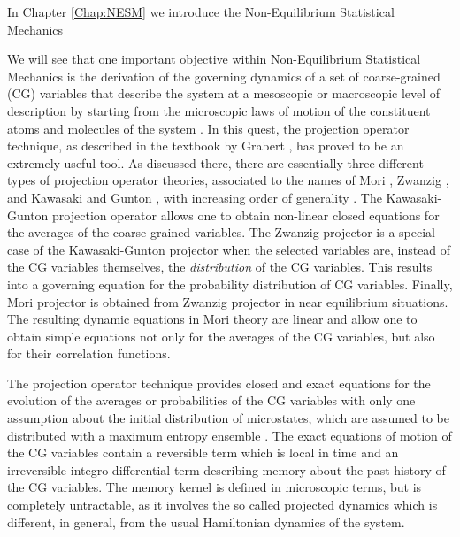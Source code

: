 \documentclass[a4paper,openright,12pt]{book}
\begin{document}
In Chapter \ref{Chap:NESM} we introduce the Non-Equilibrium Statistical Mechanics


We will see that one important  objective within Non-Equilibrium  Statistical Mechanics
is the derivation of the governing dynamics of a set of coarse-grained
(CG) variables that describe the system at a mesoscopic or macroscopic
level of description  by starting from the microscopic  laws of motion
of the constituent atoms and  molecules of the system \cite{Kubo1991}.
In this quest, the projection  operator technique, as described in the
textbook by Grabert \cite{Grabert1982}, has  proved to be an extremely
useful  tool.   As  discussed   there,  there  are  essentially  three
different  types of  projection operator  theories, associated  to the
names  of   Mori  \cite{Mori1965},  Zwanzig   \cite{Zwanzig1961},  and
Kawasaki  and Gunton  \cite{Kawasaki1973},  with  increasing order  of
generality \cite{Grabert1982}. The Kawasaki-Gunton projection operator
allows one to  obtain non-linear closed equations for  the averages of
the coarse-grained variables. The Zwanzig  projector is a special case
of  the Kawasaki-Gunton  projector  when the  selected variables  are,
instead of  the CG variables themselves,  the \textit{distribution} of
the  CG variables.  This results  into  a governing  equation for  the
probability distribution of CG  variables.  Finally, Mori projector is
obtained    from    Zwanzig     projector    in    near    equilibrium
situations\cite{Grabert1982,Kauzlaric2011a}.   The  resulting  dynamic
equations in  Mori theory are  linear and  allow one to  obtain simple
equations not only for the averages  of the CG variables, but also for
their correlation functions.

The projection operator technique  provides closed and exact equations
for the  evolution of the averages or probabilities  of the CG variables  with only one
assumption about  the initial  distribution of microstates,  which are
assumed   to  be   distributed   with  a   maximum  entropy   ensemble
\cite{Grabert1982}. The exact equations of  motion of the CG variables
contain a reversible  term which is local in time  and an irreversible
integro-differential term describing memory  about the past history of
the CG variables.  The memory  kernel is defined in microscopic terms,
but is completely untractable, as  it involves the so called projected
dynamics which  is different, in  general, from the  usual Hamiltonian
dynamics of the system.
\end{document}
